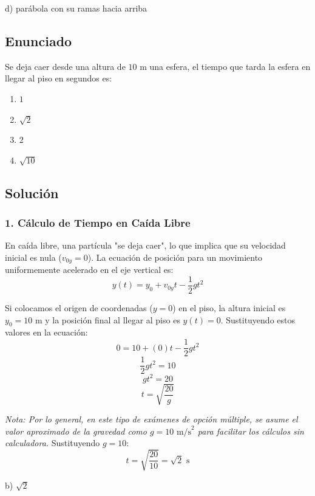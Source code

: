\documentclass[12pt, a4paper]{article}
\begin{document}
\begin{tcolorbox}[colback=green!5!white, colframe=green!50!black, title=Respuesta Final]
\centering \Large d) parábola con su ramas hacia arriba
\end{tcolorbox}

\newpage

\subsection*{Enunciado}
Se deja caer desde una altura de $10\text{ m}$ una esfera, el tiempo que tarda la esfera en llegar al piso en segundos es:
\begin{enumerate}[label=\alph*)]
    \item $1$
    \item $\sqrt{2}$
    \item $2$
    \item $\sqrt{10}$
\end{enumerate}

\subsection*{Solución}

\subsubsection*{1. Cálculo de Tiempo en Caída Libre}
En caída libre, una partícula "se deja caer", lo que implica que su velocidad inicial es nula ($v_{0y} = 0$).
La ecuación de posición para un movimiento uniformemente acelerado en el eje vertical es:
$$ y(t) = y_0 + v_{0y}t - \frac{1}{2}gt^2 $$

Si colocamos el origen de coordenadas ($y=0$) en el piso, la altura inicial es $y_0 = 10\text{ m}$ y la posición final al llegar al piso es $y(t) = 0$.
Sustituyendo estos valores en la ecuación:
$$ 0 = 10 + (0)t - \frac{1}{2}gt^2 $$
$$ \frac{1}{2}gt^2 = 10 $$
$$ gt^2 = 20 $$
$$ t = \sqrt{\frac{20}{g}} $$

\textit{Nota: Por lo general, en este tipo de exámenes de opción múltiple, se asume el valor aproximado de la gravedad como $g = 10\text{ m/s}^2$ para facilitar los cálculos sin calculadora.}
Sustituyendo $g = 10$:
$$ t = \sqrt{\frac{20}{10}} = \sqrt{2}\text{ s} $$

\begin{tcolorbox}[colback=green!5!white, colframe=green!50!black, title=Respuesta Final]
\centering \Large b) $\sqrt{2}$
\end{tcolorbox}
\end{document}
